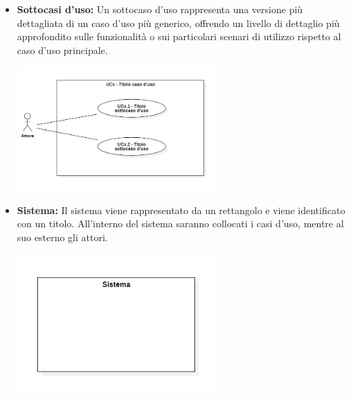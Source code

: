 \documentclass{article}
\begin{document}
\begin{itemize}
    \item \textbf{Sottocasi d'uso:}
    Un sottocaso d'uso rappresenta una versione più dettagliata di un caso d'uso più generico, offrendo un livello di dettaglio più approfondito sulle funzionalità o sui particolari scenari di utilizzo rispetto al caso d'uso principale.
    \begin{minipage}[t]{\linewidth}
        \centering
        \includegraphics[width=0.6\textwidth]{../Images/NormeDiProgetto/SottocasoD'Uso.PNG}
    \end{minipage}

    \item \textbf{Sistema:}
    Il sistema viene rappresentato da un rettangolo e viene identificato con un titolo. All'interno del sistema saranno collocati i casi d'uso, mentre al suo esterno gli attori.
    \begin{minipage}[t]{\linewidth}
        \centering
        \includegraphics[width=0.6\textwidth]{../Images/NormeDiProgetto/Sistema.PNG}
    \end{minipage}


\end{itemize}
\end{document}
